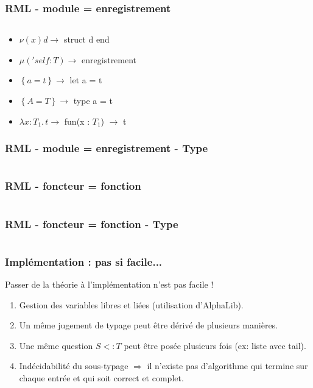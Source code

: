 \documentclass{beamer}
\newcommand{\lambdaExpr}[2]{\lambda #1 . \, #2}
\begin{document}
\begin{frame}
  \frametitle{RML - module = enregistrement}
  \inputminted{OCaml}{codes/point2d.rml}
  \begin{itemize}
  \item $\nu(x) d \rightarrow$ struct d end
  \item $\mu('self : T) \rightarrow$ enregistrement
  \item $\left\{ a = t \right\} \rightarrow$ let a = t
  \item $\left\{ A = T \right\} \rightarrow$ type a = t
  \item $\lambdaExpr{x : T_{1}}{t} \rightarrow$ fun(x : $T_{1}$) $\rightarrow$ t
  \end{itemize}
\end{frame}

\begin{frame}
  \frametitle{RML - module = enregistrement - Type}
  \inputminted{OCaml}{codes/point2d.rmli}
\end{frame}

\begin{frame}
  \frametitle{RML - foncteur = fonction}
  \inputminted{OCaml}{codes/makepoint2d.rml}
\end{frame}

\begin{frame}
  \frametitle{RML - foncteur = fonction - Type}
  \inputminted{OCaml}{codes/makepoint2d_sig.rml}
\end{frame}


\begin{frame}
  \frametitle{Implémentation : pas si facile...}
  Passer de la théorie à l'implémentation n'est pas facile !
  \begin{enumerate}
  \item Gestion des variables libres et liées (utilisation d'AlphaLib).
  \item Un même jugement de typage peut être dérivé de plusieurs manières.
  \item Une même question $S <: T$ peut être posée plusieurs fois (ex: liste
    avec tail).
  \item Indécidabilité du sous-typage $\Rightarrow$ il n'existe pas d'algorithme
    qui termine sur chaque entrée et qui soit correct et complet.
  \end{enumerate}
\end{frame}

\end{document}
